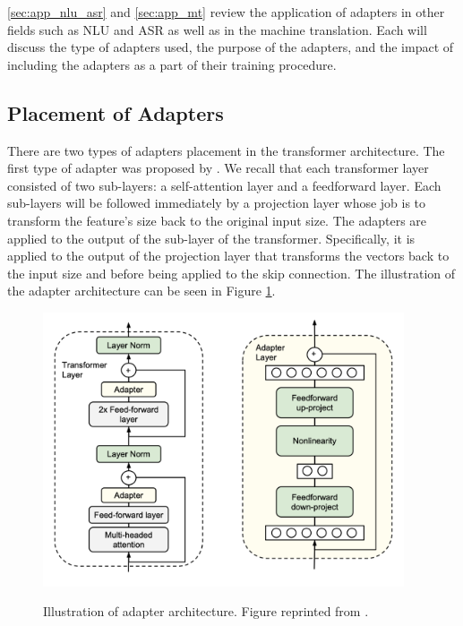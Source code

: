 \cref{sec:app_nlu_asr} and \cref{sec:app_mt} review the application of adapters in other fields such as NLU and ASR as well as in the machine translation. Each will discuss the type of adapters used, the purpose of the adapters, and the impact of including the adapters as a part of their training procedure.

\subsection{Placement of Adapters}
\label{sec:adapter_place}
There are two types of adapters placement in the transformer architecture. The first type of adapter was proposed by . We recall that each transformer layer consisted of two sub-layers: a self-attention layer and a feedforward layer. Each sub-layers will be followed immediately by a projection layer whose job is to transform the feature's size back to the original input size. The adapters are applied to the output of the sub-layer of the transformer. Specifically, it is applied to the output of the projection layer that transforms the vectors back to the input size and before being applied to the skip connection. The illustration of the adapter architecture can be seen in Figure \ref{img:ada_houlsby}.

\begin{figure}[h]
    {\includegraphics[width=0.95\textwidth]{img/adapter_houlsby.png}}
    \centering
    \caption{Illustration of adapter architecture. Figure reprinted from .}
    \label{img:ada_houlsby}
\end{figure}


